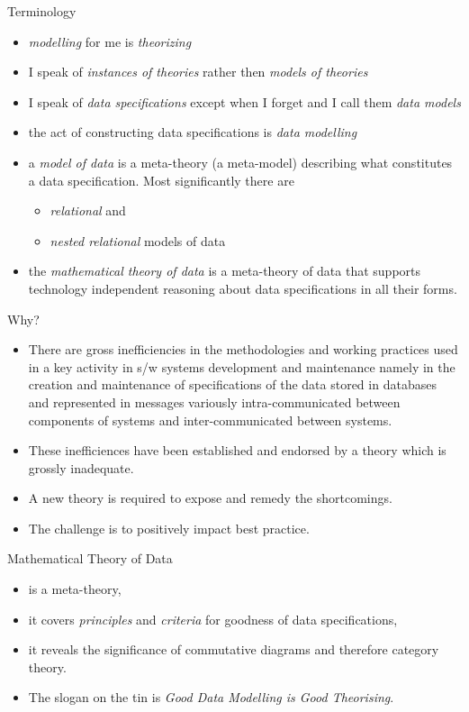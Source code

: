 \begin{frame}{Terminology}
\begin{itemize}
\item \textit{modelling} for me is \textit{theorizing}
\item I speak of \textit{instances of theories}  rather then \textit{models of theories}
\item I speak of \textit{data specifications} except when I forget and I call them \textit{data models}
\item the act of constructing data specifications is \textit{data modelling}
\item a \textit{model of data} is a meta-theory (a meta-model) describing what constitutes a data specification. Most significantly there are
\begin{itemize}
\item \textit{relational} and 
\item \textit{nested relational} 
models of data
\end{itemize}
\item the \textit{mathematical theory of data} is a meta-theory of data that supports technology  independent reasoning about data specifications in all their forms.
\end{itemize}
\end{frame}

\begin{frame}{Why?}
\begin{itemize}[<+->]
  \item There are gross inefficiencies in the methodologies and working practices used in  a key activity in s/w systems development and maintenance namely in  the creation and maintenance of specifications of the data stored in databases and 
  represented in messages variously intra-communicated between components of systems and inter-communicated between systems. 
  \item These inefficiences have been established and endorsed by a theory which is grossly inadequate.
  \item A new theory is required to expose and remedy the shortcomings.
  \item The challenge is to positively impact best practice.
\end{itemize}
\end{frame}

\begin{frame}{Mathematical Theory of Data}
\begin{itemize}
\item is a meta-theory,
\item it covers \textit{principles} and \textit{criteria} for goodness of data specifications,
\item it reveals the significance of commutative diagrams and therefore category theory.
\item The slogan on the tin is \textit{Good Data Modelling is Good Theorising}. 
\end{itemize}
\end{frame}


